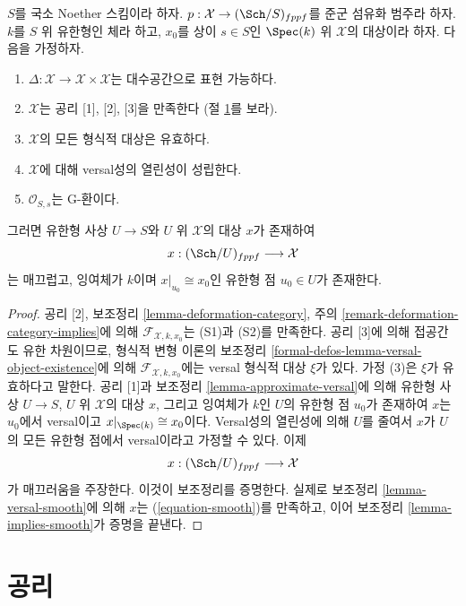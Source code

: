 \begin{lemma}
\label{lemma-get-smooth}
$S$를 국소 Noether 스킴이라 하자.
$p : \mathcal{X} \to (\Sch/S)_{fppf}$를 준군 섬유화 범주라 하자.
$k$를 $S$ 위 유한형인 체라 하고, $x_0$를 상이 $s \in S$인
$\Spec(k)$ 위 $\mathcal{X}$의 대상이라 하자. 다음을 가정하자.
\begin{enumerate}
\item $\Delta : \mathcal{X} \to \mathcal{X} \times \mathcal{X}$는
대수공간으로 표현 가능하다.
\item $\mathcal{X}$는 공리 [1], [2], [3]을 만족한다
(절 \ref{section-axioms}를 보라).
\item $\mathcal{X}$의 모든 형식적 대상은 유효하다.
\item $\mathcal{X}$에 대해 versal성의 열린성이 성립한다.
\item $\mathcal{O}_{S, s}$는 G-환이다.
\end{enumerate}
그러면 유한형 사상 $U \to S$와 $U$ 위 $\mathcal{X}$의 대상 $x$가
존재하여
$$
x : (\Sch/U)_{fppf} \longrightarrow \mathcal{X}
$$
는 매끄럽고, 잉여체가 $k$이며 $x|_{u_0} \cong x_0$인 유한형 점
$u_0 \in U$가 존재한다.
\end{lemma}

\begin{proof}
공리 [2], 보조정리 \ref{lemma-deformation-category}, 주의
\ref{remark-deformation-category-implies}에 의해
$\mathcal{F}_{\mathcal{X}, k, x_0}$는 (S1)과 (S2)를 만족한다.
공리 [3]에 의해 접공간도 유한 차원이므로, 형식적 변형 이론의
보조정리 \ref{formal-defos-lemma-versal-object-existence}에 의해
$\mathcal{F}_{\mathcal{X}, k, x_0}$에는 versal 형식적 대상 $\xi$가 있다.
가정 (3)은 $\xi$가 유효하다고 말한다. 공리 [1]과 보조정리
\ref{lemma-approximate-versal}에 의해 유한형 사상 $U \to S$,
$U$ 위 $\mathcal{X}$의 대상 $x$, 그리고 잉여체가 $k$인 $U$의
유한형 점 $u_0$가 존재하여 $x$는 $u_0$에서 versal이고
$x|_{\Spec(k)} \cong x_0$이다. Versal성의 열린성에 의해 $U$를
줄여서 $x$가 $U$의 모든 유한형 점에서 versal이라고 가정할 수 있다.
이제
$$
x : (\Sch/U)_{fppf} \longrightarrow \mathcal{X}
$$
가 매끄러움을 주장한다. 이것이 보조정리를 증명한다.
실제로 보조정리 \ref{lemma-versal-smooth}에 의해 $x$는
(\ref{equation-smooth})를 만족하고, 이어 보조정리
\ref{lemma-implies-smooth}가 증명을 끝낸다.
\end{proof}






\section{공리}
\label{section-axioms}

